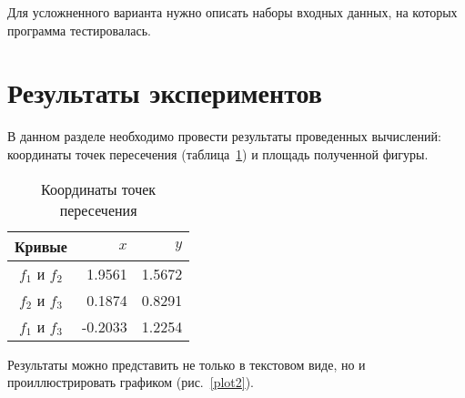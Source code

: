 \documentclass[a4paper,12pt,titlepage,draft]{article}
\begin{document}
Для усложненного варианта нужно описать наборы входных данных, на которых
программа тестировалась.

\newpage

\section{Результаты экспериментов}

В данном разделе необходимо провести результаты проведенных вычислений:
координаты точек пересечения (таблица~\ref{table1}) и площадь полученной фигуры.

\begin{table}[h]
\centering
\begin{tabular}{crr}
\toprule
Кривые & $x$ & $y$ \\
\midrule
$f_1$ и $f_2$ &  1.9561 & 1.5672 \\
$f_2$ и $f_3$ &  0.1874 & 0.8291 \\
$f_1$ и $f_3$ & -0.2033 & 1.2254 \\
\bottomrule
\end{tabular}
\caption{Координаты точек пересечения}
\label{table1}
\end{table}


Результаты можно представить не только в текстовом виде, но и 
проиллюстрировать графиком (рис.~\ref{plot2}).
\end{document}
